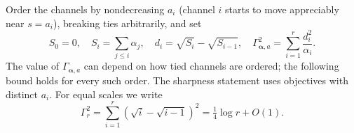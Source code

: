 Order the channels by nondecreasing $a_i$ (channel $i$ starts to move
appreciably near $s=a_i$), breaking ties arbitrarily, and set
\begin{equation}
 S_0=0,\quad S_i=\sum_{j\leq i}\alpha_j,\quad
 d_i=\sqrt{S_i}-\sqrt{S_{i-1}},\quad
 \Gamma_{\boldsymbol\alpha,a}^2=\sum_{i=1}^r\frac{d_i^2}{\alpha_i}.
 \label{eq:weighted-Gamma}
\end{equation}
The value of $\Gamma_{\boldsymbol\alpha,a}$ can depend on how tied
channels are ordered; the following bound holds for every such order.
The sharpness statement uses objectives with distinct $a_i$. For equal
scales we write
\begin{equation}
 \Gamma_r^2=\sum_{i=1}^r(\sqrt i-\sqrt{i-1})^2
 =\tfrac14\log r+O(1).
 \label{eq:Gamma-r}
\end{equation}

